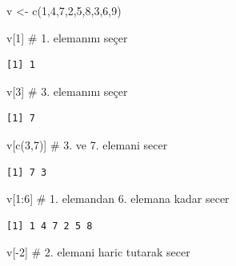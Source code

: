 \documentclass[
  letterpaper,
  DIV=11,
  numbers=noendperiod]{scrreprt}
\newenvironment{Shaded}{\begin{snugshade}}{\end{snugshade}}
\newcommand{\CommentTok}[1]{\textcolor[rgb]{0.37,0.37,0.37}{#1}}
\newcommand{\DecValTok}[1]{\textcolor[rgb]{0.68,0.00,0.00}{#1}}
\newcommand{\FunctionTok}[1]{\textcolor[rgb]{0.28,0.35,0.67}{#1}}
\newcommand{\NormalTok}[1]{\textcolor[rgb]{0.00,0.23,0.31}{#1}}
\newcommand{\OtherTok}[1]{\textcolor[rgb]{0.00,0.23,0.31}{#1}}
\newcommand{\SpecialCharTok}[1]{\textcolor[rgb]{0.37,0.37,0.37}{#1}}
\begin{document}
\begin{Shaded}
\begin{Highlighting}[]
\NormalTok{v }\OtherTok{\textless{}{-}} \FunctionTok{c}\NormalTok{(}\DecValTok{1}\NormalTok{,}\DecValTok{4}\NormalTok{,}\DecValTok{7}\NormalTok{,}\DecValTok{2}\NormalTok{,}\DecValTok{5}\NormalTok{,}\DecValTok{8}\NormalTok{,}\DecValTok{3}\NormalTok{,}\DecValTok{6}\NormalTok{,}\DecValTok{9}\NormalTok{)}

\NormalTok{v[}\DecValTok{1}\NormalTok{] }\CommentTok{\# 1. elemanını seçer}
\end{Highlighting}
\end{Shaded}

\begin{verbatim}
[1] 1
\end{verbatim}

\begin{Shaded}
\begin{Highlighting}[]
\NormalTok{v[}\DecValTok{3}\NormalTok{] }\CommentTok{\# 3. elemanını seçer}
\end{Highlighting}
\end{Shaded}

\begin{verbatim}
[1] 7
\end{verbatim}

\begin{Shaded}
\begin{Highlighting}[]
\NormalTok{v[}\FunctionTok{c}\NormalTok{(}\DecValTok{3}\NormalTok{,}\DecValTok{7}\NormalTok{)] }\CommentTok{\# 3. ve 7. elemani secer}
\end{Highlighting}
\end{Shaded}

\begin{verbatim}
[1] 7 3
\end{verbatim}

\begin{Shaded}
\begin{Highlighting}[]
\NormalTok{v[}\DecValTok{1}\SpecialCharTok{:}\DecValTok{6}\NormalTok{] }\CommentTok{\# 1. elemandan 6. elemana kadar secer}
\end{Highlighting}
\end{Shaded}

\begin{verbatim}
[1] 1 4 7 2 5 8
\end{verbatim}

\begin{Shaded}
\begin{Highlighting}[]
\NormalTok{v[}\SpecialCharTok{{-}}\DecValTok{2}\NormalTok{] }\CommentTok{\# 2. elemani haric tutarak secer}
\end{Highlighting}
\end{Shaded}
\end{document}
